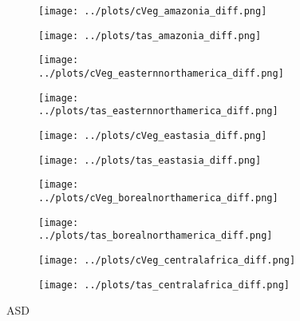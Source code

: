\documentclass[]{article}
\begin{document}
\begin{figure}[H]
    \centering
    \begin{subfigure}[b]{0.4\linewidth}
        \texttt{[image: ../plots/cVeg\_amazonia\_diff.png]}
    \end{subfigure}
    \begin{subfigure}[b]{0.4\linewidth}
        \texttt{[image: ../plots/tas\_amazonia\_diff.png]}
    \end{subfigure}
    \begin{subfigure}[b]{0.4\linewidth}
        \texttt{[image: ../plots/cVeg\_easternnorthamerica\_diff.png]}
    \end{subfigure}
    \begin{subfigure}[b]{0.4\linewidth}
        \texttt{[image: ../plots/tas\_easternnorthamerica\_diff.png]}
    \end{subfigure}
    \begin{subfigure}[b]{0.4\linewidth}
        \texttt{[image: ../plots/cVeg\_eastasia\_diff.png]}
    \end{subfigure}
    \begin{subfigure}[b]{0.4\linewidth}
        \texttt{[image: ../plots/tas\_eastasia\_diff.png]}
    \end{subfigure}
    \begin{subfigure}[b]{0.4\linewidth}
        \texttt{[image: ../plots/cVeg\_borealnorthamerica\_diff.png]}
    \end{subfigure}
    \begin{subfigure}[b]{0.4\linewidth}
        \texttt{[image: ../plots/tas\_borealnorthamerica\_diff.png]}
    \end{subfigure}
    \begin{subfigure}[b]{0.4\linewidth}
        \texttt{[image: ../plots/cVeg\_centralafrica\_diff.png]}
    \end{subfigure}
    \begin{subfigure}[b]{0.4\linewidth}
        \texttt{[image: ../plots/tas\_centralafrica\_diff.png]}
    \end{subfigure}
    \caption{ASD}
    \label{fig:aus_region}
\end{figure}
\end{document}
